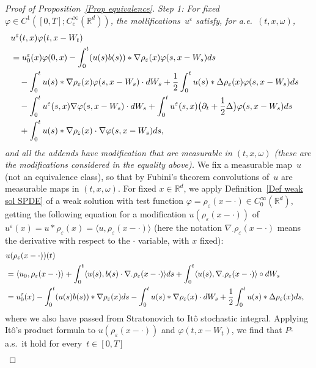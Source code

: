 \documentclass[a4paper,10pt]{article}
\newcommand\1{\mathbbm{1}}
\newcommand{\lan}{\langle}
\newcommand{\ran}{\rangle}
\newcommand{\eps}{\varepsilon}
\numberwithin{equation}{section}
\begin{document}
\begin{proof}[Proof of Proposition~\ref{Prop equivalence}]
\emph{Step 1: For fixed $\varphi \in C^1([0,T];C^\infty_c(\mathbb{R}^d))$, the mollifications~$u^\eps$ satisfy, for a.e.~$(t,x,\omega)$, }
\begin{align}
\lefteqn{ u^\eps(t,x)\varphi(t,x-W_t)} \label{muvarphi}\\
 & = u_0^\eps(x)\varphi(0,x) -\int^t_0(u(s) b(s))*\nabla\rho_\eps(x)\varphi(s,x-W_s) ds \nonumber\\
 & \quad -\int^t_0 u(s)*\nabla\rho_\eps(x)\varphi(s,x-W_s)\cdot d W_s +\frac12 \int^t_0 u(s)*\Delta\rho_\eps(x)\varphi(s,x-W_s) ds \nonumber\\
 & \quad -\int^t_0 u^\eps(s,x)\nabla\varphi(s,x-W_s)\cdot d W_s +\int^t_0 u^\eps(s,x) \big(\partial_t+\frac12\Delta\big)\varphi(s,x-W_s) ds \nonumber\\
 & \quad +\int^t_0 u(s)*\nabla\rho_\eps(x)\cdot\nabla\varphi(s,x-W_s) ds,\nonumber
\end{align}
\emph{and all the addends have modification that are measurable in $(t,x,\omega)$ \textup{(}these are the modifications considered in the equality above\textup{)}.} We fix a measurable map~$u$ (not an equivalence class), so that by Fubini's theorem convolutions of~$u$ are measurable maps in $(t,x,\omega)$. For fixed $x \in \mathbb{R}^d$, we apply Definition~\ref{Def weak sol SPDE} of a weak solution with test function $\varphi=\rho_\eps(x-\cdot) \in C^\infty_0(\mathbb{R}^d)$, getting the following equation for a modification $u(\rho_\eps(x-\cdot))$ of $u^\eps(x) = u*\rho_\eps (x) = \lan u, \rho_\eps(x-\cdot) \ran$ (here the notation $\nabla_\cdot \rho_\eps(x-\cdot)$ means the derivative with respect to the $\cdot$ variable, with $x$ fixed):
\begin{align}
\label{eqn_u_eps_tested_1}
\lefteqn{u(\rho_\eps(x-\cdot))(t)}\\ 
 & = \langle u_{0},\rho_\eps(x-\cdot) \rangle +\int_{0}^{t} \lan u(s),b(s)  \cdot
\nabla_\cdot \rho_\eps(x-\cdot)\ran ds + \int_{0}^{t} \lan u(s),\nabla_\cdot \rho_\eps(x-\cdot) \ran \circ dW_{s} \nonumber \\
 & = u_0^\eps(x) -\int^t_0( u(s) b(s))*\nabla\rho_\eps(x) d s - \int^t_0  u(s)*\nabla\rho_\eps(x)\cdot d W_s +\frac12\int^t_0 u(s)*\Delta\rho_\eps(x) ds, \nonumber
\end{align}
where we also have passed from Stratonovich to It\^o stochastic integral. Applying It\^o's product formula to $u(\rho_\eps(x-\cdot))$ and $\varphi(t,x-W_t)$, we find that $P$-a.s.~it hold for every~$t \in [0,T]$
\begin{align}
\label{eqn_u_eps_tested_2}

\end{align}
\end{proof}
\end{document}
